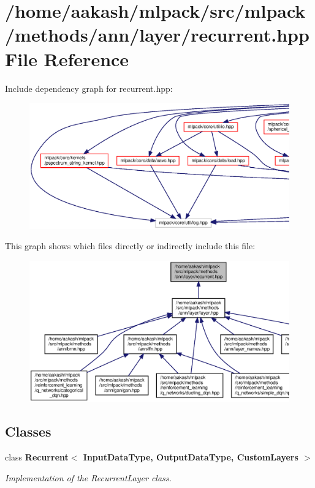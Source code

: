 \section{/home/aakash/mlpack/src/mlpack/methods/ann/layer/recurrent.hpp File Reference}
\label{recurrent_8hpp}
Include dependency graph for recurrent.\+hpp\+:
\nopagebreak
\begin{figure}[H]
\begin{center}
\leavevmode
\includegraphics[width=350pt]{recurrent_8hpp__incl}
\end{center}
\end{figure}
This graph shows which files directly or indirectly include this file\+:
\nopagebreak
\begin{figure}[H]
\begin{center}
\leavevmode
\includegraphics[width=350pt]{recurrent_8hpp__dep__incl}
\end{center}
\end{figure}
\subsection*{Classes}
\begin{DoxyCompactItemize}
\item 
class \textbf{ Recurrent$<$ Input\+Data\+Type, Output\+Data\+Type, Custom\+Layers $>$}
\begin{DoxyCompactList}\small\item\em Implementation of the Recurrent\+Layer class. \end{DoxyCompactList}\end{DoxyCompactItemize}
